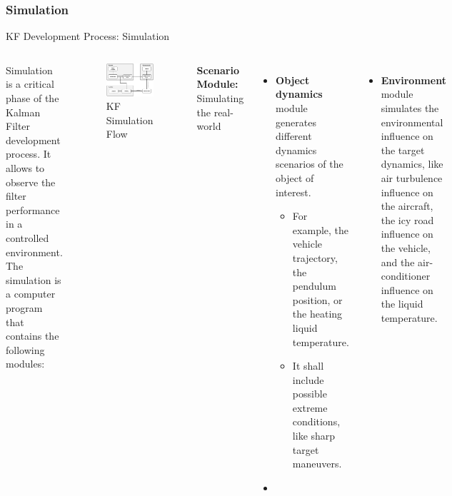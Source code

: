 \subsubsection{Simulation}
\begin{frame}{KF Development Process: Simulation}
\begin{columns}
    Simulation is a critical phase of the Kalman Filter development process. It allows to observe the filter performance in a controlled environment. The simulation is a computer program that contains the following modules:
    \begin{figure}
        \centering
        \includegraphics[width=0.7\linewidth]{Figures//Part4/KFSimulationFlow.png}
        \vspace{-10pt}
        \caption{KF Simulation Flow}
        \vspace{-10pt}
    \end{figure}
    \textbf{Scenario Module:} Simulating the real-world
    \begin{itemize}
        \item \textbf{Object dynamics} module generates different dynamics scenarios of the object of interest.
        \begin{itemize}
            \item For example, the vehicle trajectory, the pendulum position, or the heating liquid temperature.
            \item It shall include possible extreme conditions, like sharp target maneuvers.
        \end{itemize}
        \item 
    \end{itemize}
    \begin{itemize}
        \item \textbf{Environment} module simulates the environmental influence on the target dynamics, like air turbulence influence on the aircraft, the icy road influence on the vehicle, and the air-conditioner influence on the liquid temperature.


\end{itemize}
\end{columns}
\end{frame}
